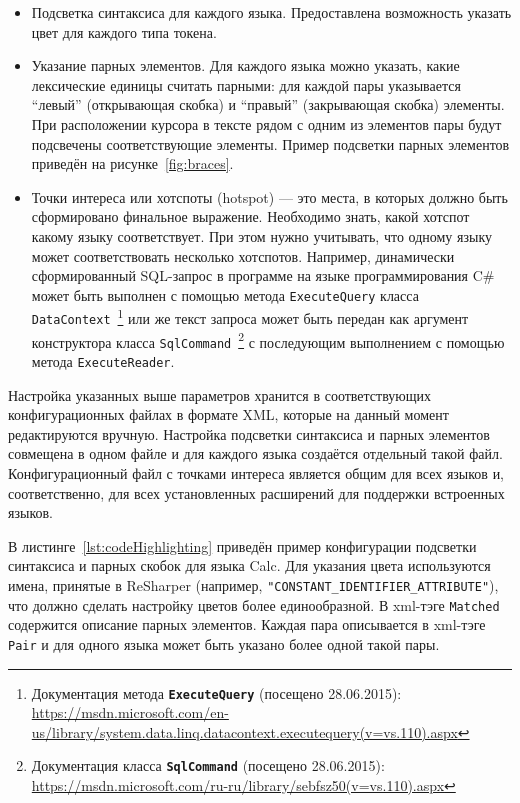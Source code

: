 \begin{itemize}
    \item Подсветка синтаксиса для каждого языка. Предоставлена возможность указать цвет для каждого типа токена.
    \item Указание парных элементов. Для каждого языка можно указать, какие лексические единицы считать парными: для каждой пары указывается ``левый'' (открывающая скобка) и ``правый'' (закрывающая скобка) элементы. При расположении курсора в тексте рядом с одним из элементов пары будут подсвечены соответствующие элементы. Пример подсветки парных элементов приведён на рисунке~\ref{fig:braces}.
    \item Точки интереса или хотспоты (hotspot) --- это места, в которых должно быть сформировано финальное выражение. Необходимо знать, какой хотспот какому языку соответствует. При этом нужно учитывать, что одному языку может соответствовать несколько хотспотов. Например, динамически сформированный SQL-запрос в программе на языке программирования C\# может быть выполнен с помощью метода \verb|ExecuteQuery| класса \verb|DataContext|~\footnote{Документация метода \textbf{\texttt{ExecuteQuery}} (посещено 28.06.2015): \url{https://msdn.microsoft.com/en-us/library/system.data.linq.datacontext.executequery(v=vs.110).aspx}} или же текст запроса может быть передан как аргумент конструктора класса \verb|SqlCommand|~\footnote{Документация класса \textbf{\texttt{SqlCommand}} (посещено 28.06.2015): \url{https://msdn.microsoft.com/ru-ru/library/sebfsz50(v=vs.110).aspx}} с последующим выполнением с помощью метода \verb|ExecuteReader|.

\end{itemize}

Настройка указанных выше параметров хранится в соответствующих конфигурационных файлах в формате XML, которые на данный момент редактируются вручную. Настройка подсветки синтаксиса и парных элементов совмещена в одном файле и для каждого языка создаётся отдельный такой файл. Конфигурационный файл с точками интереса является общим для всех языков и, соответственно, для всех установленных расширений для поддержки встроенных языков.

В листинге~\ref{lst:codeHighlighting} приведён пример конфигурации подсветки синтаксиса и парных скобок для языка Calc. Для указания цвета используются имена, принятые в ReSharper (например, \verb|"CONSTANT_IDENTIFIER_ATTRIBUTE"|), что должно сделать настройку цветов более единообразной. В xml-тэге \verb|Matched| содержится описание парных элементов. Каждая пара описывается в xml-тэге \verb|Pair| и для одного языка может быть указано более одной такой пары.

